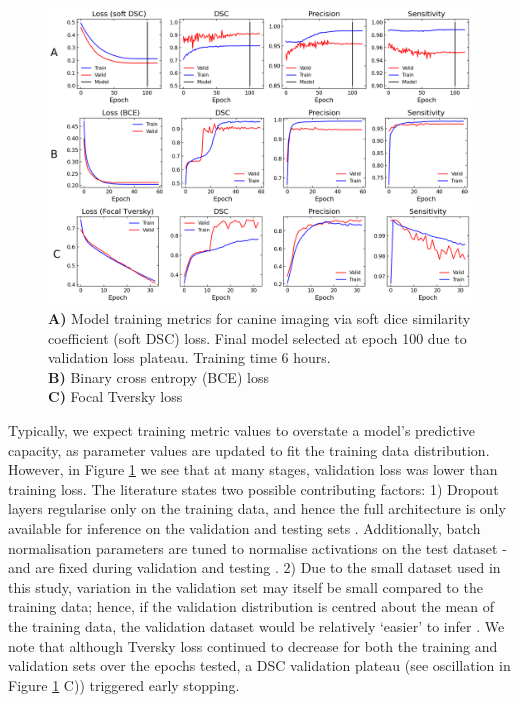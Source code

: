 

\begin{figure}[H]
	\begin{center}
		\hspace*{-1.2cm}\includegraphics[width=1.15\textwidth]{figures/vacbag_metrics_combined}
		\caption{\textbf{A)} Model training metrics for canine imaging via soft dice similarity coefficient (soft DSC) loss. Final model selected at epoch 100 due to validation loss plateau. Training time 6 hours.\\
		\textbf{B)} Binary cross entropy (BCE) loss\\
		\textbf{C)} Focal Tversky loss}
		\label{fig:vet_metrics}
	\end{center}
\end{figure}

Typically, we expect training metric values to overstate a model's predictive capacity, as parameter values are updated to fit the training data distribution. However, in Figure \ref{fig:vet_metrics} we see that at many stages, validation loss was lower than training loss. The literature states two possible contributing factors: 1) Dropout layers regularise only on the training data, and hence the full architecture is only available for inference on the validation and testing sets \cite{srivastava2014}. Additionally, batch normalisation parameters are tuned to normalise activations on the test dataset - and are fixed during validation and testing \cite{CITATION}. 2) Due to the small dataset used in this study, variation in the validation set may itself be small compared to the training data; hence, if the validation distribution is centred about the mean of the training data, the validation dataset would be relatively `easier' to infer \cite{CITATION}. We note that although Tversky loss continued to decrease for both the training and validation sets over the epochs tested, a DSC validation plateau (see oscillation in Figure \ref{fig:vet_metrics} C)) triggered early stopping.

